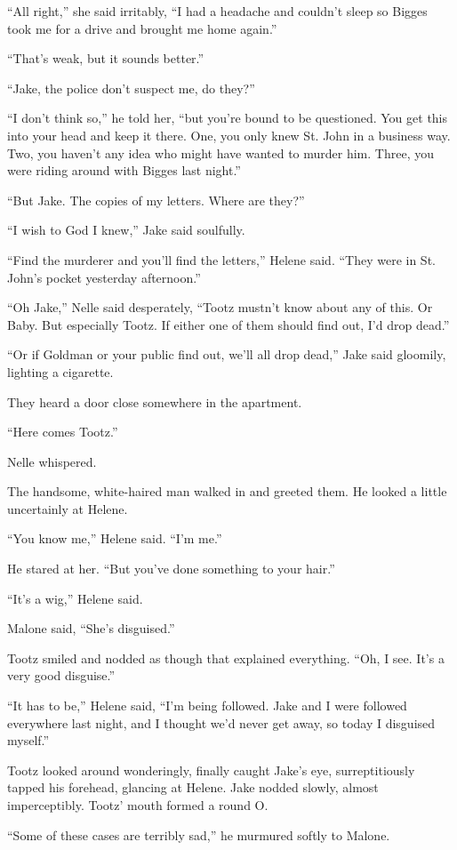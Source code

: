 \documentclass{novel}
\begin{document}
“All right,” she said irritably, “I had a headache and couldn’t sleep so Bigges took me for a drive and brought me home again.”

“That’s weak, but it sounds better.”

“Jake, the police don’t suspect me, do they?”

“I don’t think so,” he told her, “but you’re bound to be questioned. You get this into your head and keep it there. One, you only knew St. John in a business way. Two, you haven’t any idea who might have wanted to murder him. Three, you were riding around with Bigges last night.”

“But Jake. The copies of my letters. Where are they?”

“I wish to God I knew,” Jake said soulfully.

“Find the murderer and you’ll find the letters,” Helene said. “They were in St. John’s pocket yesterday afternoon.”

“Oh Jake,” Nelle said desperately, “Tootz mustn’t know about any of this. Or Baby. But especially Tootz. If either one of them should find out, I’d drop dead.”

“Or if Goldman or your public find out, we’ll all drop dead,” Jake said gloomily, lighting a cigarette.

They heard a door close somewhere in the apartment.

“Here comes Tootz.”

Nelle whispered.

The handsome, white-haired man walked in and greeted them. He looked a little uncertainly at Helene.

“You know me,” Helene said. “I’m me.”

He stared at her. “But you’ve done something to your hair.”

“It’s a wig,” Helene said.

Malone said, “She’s disguised.”

Tootz smiled and nodded as though that explained everything. “Oh, I see. It’s a very good disguise.”

“It has to be,” Helene said, “I’m being followed. Jake and I were followed everywhere last night, and I thought we’d never get away, so today I disguised myself.”

Tootz looked around wonderingly, finally caught Jake’s eye, surreptitiously tapped his forehead, glancing at Helene. Jake nodded slowly, almost imperceptibly. Tootz’ mouth formed a round O.

“Some of these cases are terribly sad,” he murmured softly to Malone.
\end{document}
